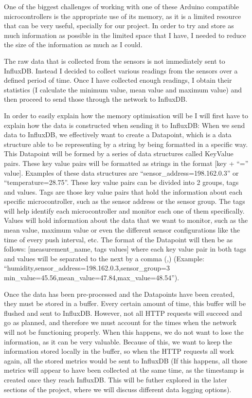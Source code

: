 \documentclass[12pt]{article}
\begin{document}
One of the biggest challenges of working with one of these Arduino compatible microcontrollers is the appropriate use of its memory, as it is a limited resource that can be very useful, specially for our project. In order to try and store as much information as possible in the limited space that I have, I needed to reduce the size of the information as much as I could.\par

The raw data that is collected from the sensors is not immediately sent to InfluxDB. Instead I decided to collect various readings from the sensors over a defined period of time. Once I have collected enough readings, I obtain their statistics (I calculate the minimum value, mean value and maximum value) and then proceed to send those through the network to InfluxDB.\par 

In order to easily explain how the memory optimisation will be I will first have to explain how the data is constructed when sending it to InfluxDB: When we send data to InfluxDB, we effectively want to create a Datapoint, which is a data structure able to be representing by a string by being formatted in a specific way. This Datapoint will be formed by a series of data structures called KeyValue pairs. These key value pairs will be formatted as strings in the format [key + ``='' value]. Examples of these data structures are ``sensor\_address=198.162.0.3'' or ``temperature=28.75''. These key value pairs can be divided into 2 groups, tags and values. Tags are those key value pairs that hold the information about each specific microcontroller, such as the sensor address or the sensor group. The tags will help identify each microcontroller and monitor each one of them specifically. Values will hold information about the data that we want to monitor, such as the mean value, maximum value or even the different sensor configurations like the time of every push interval, etc. The format of the Datapoint will then be as follows: [measurement\_name, tags values] where each key value pair in both tags and values will be separated to the next by a comma (,) (Example: ``humidity,sensor\_address=198.162.0.3,sensor\_group=3 min\_value=45.56,mean\_value=47.84,max\_value=48.54'').\par

Once the data has been pre-processed and the Datapoints have been created, they must be stored in a buffer. Every certain amount of time, this buffer will be flushed and sent to InfluxDB. However, not all HTTP requests will succeed and go as planned, and therefore we must account for the times when the network will not be functioning properly. When this happens, we do not want to lose the information, as it can be very valuable. Because of this, we want to keep the information stored locally in the buffer, so when the HTTP requests all work again, all the stored metrics would be sent to InfluxDB (If this happens, all those metrics will appear to have been collected at the same time, as the timestamp is created once they reach InfluxDB. This will be futher explored in the later sections of the project, where we will discuss different data logging options).\par
\end{document}
